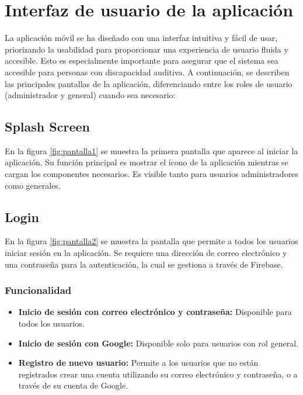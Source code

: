 \section{Interfaz de usuario de la aplicación}

La aplicación móvil se ha diseñado con una interfaz intuitiva y fácil de usar, priorizando la usabilidad para proporcionar una experiencia de usuario fluida y accesible. Esto es especialmente importante para asegurar que el sistema sea accesible para personas con discapacidad auditiva. A continuación, se describen las principales pantallas de la aplicación, diferenciando entre los roles de usuario (administrador y general) cuando sea necesario:

\subsection{Splash Screen}


En la figura \ref{fig:pantalla1} se muestra la primera pantalla que aparece al iniciar la aplicación. Su función principal es mostrar el ícono de la aplicación mientras se cargan los componentes necesarios.  Es visible tanto para usuarios administradores como generales.

\subsection{Login}


En la figura \ref{fig:pantalla2} se muestra la pantalla que permite a todos los usuarios iniciar sesión en la aplicación. Se requiere una dirección de correo electrónico y una contraseña para la autenticación, la cual se gestiona a través de Firebase.

\subsubsection{Funcionalidad}

\begin{itemize}
    \item \textbf{Inicio de sesión con correo electrónico y contraseña:} Disponible para todos los usuarios.
    \item \textbf{Inicio de sesión con Google:} Disponible solo para usuarios con rol general.
    \item \textbf{Registro de nuevo usuario:} Permite a los usuarios que no están registrados crear una cuenta utilizando su correo electrónico y contraseña, o a través de su cuenta de Google.
\end{itemize}

